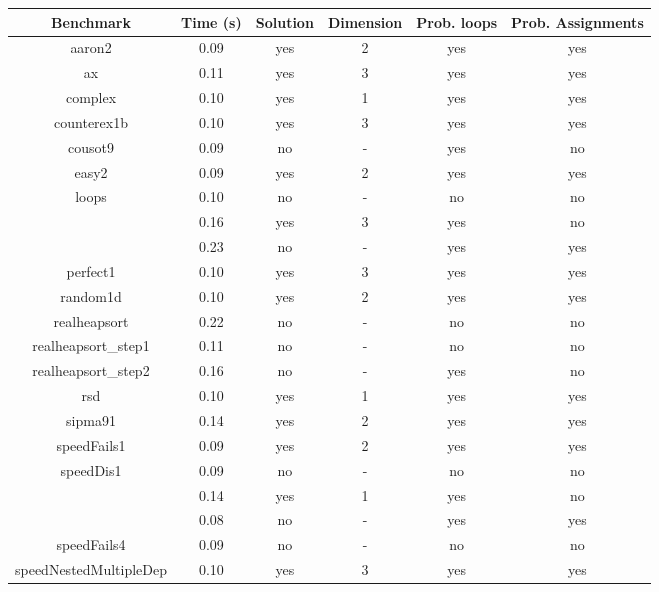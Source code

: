 \begin{center}
\begin{table}[]
  \centering
   \begin{tabular}{c|c|c|c|c|c}
    
{Benchmark} & {Time (s)} & {Solution} & {Dimension} & {Prob. loops} & {Prob. Assignments} \\\hline \hline
{aaron2} & {0.09} & {yes} & {2} & {yes} & {yes} \\\hline
{ax} & {0.11} & {yes} & {3} & {yes} & {yes} \\\hline
{complex} & {0.10} & {yes} & {1} & {yes} & {yes} \\\hline
{counterex1b} & {0.10} & {yes} & {3} & {yes} & {yes} \\\hline
{cousot9} & {0.09} & {no} & {-} & {yes} & {no} \\\hline
{easy2} & {0.09} & {yes} & {2} & {yes} & {yes} \\\hline
{loops} & {0.10} & {no} & {-} & {no} & {no} \\\hline
{\multirow{2}{*}{nestedloop}} & {0.16} & {yes} & {3} & {yes} & {no} \\\cline{2-6}
{} & {0.23} & {no} & {-} & {yes} & {yes} \\\hline
{perfect1} & {0.10} & {yes} & {3} & {yes} & {yes} \\\hline
{random1d} & {0.10} & {yes} & {2} & {yes} & {yes} \\\hline
{realheapsort} & {0.22} & {no} & {-} & {no} & {no} \\\hline
{realheapsort\_step1} & {0.11} & {no} & {-} & {no} & {no} \\\hline
{realheapsort\_step2} & {0.16} & {no} & {-} & {yes} & {no} \\\hline
{rsd} & {0.10} & {yes} & {1} & {yes} & {yes} \\\hline
{sipma91} & {0.14} & {yes} & {2} & {yes} & {yes} \\\hline
{speedFails1} & {0.09} & {yes} & {2} & {yes} & {yes} \\\hline
{speedDis1} & {0.09} & {no} & {-} & {no} & {no} \\\hline
{\multirow{2}{*}{speedFails2}} & {0.14} & {yes} & {1} & {yes} & {no} \\\cline{2-6}
{} & {0.08} & {no} & {-} & {yes} & {yes} \\\hline
{speedFails4} & {0.09} & {no} & {-} & {no} & {no} \\\hline
{speedNestedMultipleDep} & {0.10} & {yes} & {3} & {yes} & {yes} \\\hline

\end{tabular}
\end{table}
\end{center}
